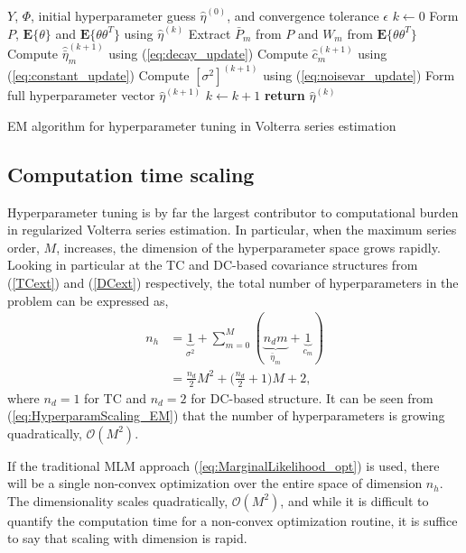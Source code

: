 \begin{algorithm}[h]
\begin{algorithmic}[1]
\Require $Y$, $\Phi$, initial hyperparameter guess $\hat{\eta}^{(0)}$, and convergence tolerance $\epsilon$
\State $k \gets 0$
\State Form $P$, $\textbf{E} \{ \theta \}$ and $\textbf{E} \{ \theta \theta^T \}$ using $\hat{\eta}^{(k)}$
\State Extract $\bar{P}_m$ from $P$ and $W_m$ from $\textbf{E} \{ \theta \theta^T \}$
	\State Compute $\hat{\bar{\eta}}_m^{(k+1)}$ using (\ref{eq:decay_update})
\EndIf
\State Compute $\hat{c}_m^{(k+1)}$ using (\ref{eq:constant_update})
\EndFor
\State Compute $[\sigma^2]^{(k+1)}$ using (\ref{eq:noisevar_update})
\State Form full hyperparameter vector $\hat{\eta}^{(k+1)}$
\State $k \gets k+1$
\EndWhile
\State \textbf{return} $\hat{\eta}^{(k)}$
\end{algorithmic}
\caption{EM algorithm for hyperparameter tuning in Volterra series estimation}
\label{alg:EMtuning}
\end{algorithm}

\subsection{Computation time scaling}

Hyperparameter tuning is by far the largest contributor to computational burden in regularized Volterra series estimation. In particular, when the maximum series order, $M$, increases, the dimension of the hyperparameter space grows rapidly. Looking in particular at the TC and DC-based covariance structures from (\ref{TCext}) and (\ref{DCext}) respectively, the total number of hyperparameters in the problem can be expressed as,
\begin{align}
n_h &= \underbrace{1}_{\sigma^2} + \sum_{m=0}^M (\underbrace{n_d m}_{\bar{\eta}_m} + \underbrace{1}_{c_m}) \\
&= \frac{n_d}{2} M^2 + \bigg( \frac{n_d}{2} + 1 \bigg) M + 2,
\label{eq:HyperparamScaling_EM}
\end{align}
where $n_d = 1$ for TC and $n_d = 2$ for DC-based structure. It can be seen from (\ref{eq:HyperparamScaling_EM}) that the number of hyperparameters is growing quadratically, $\mathcal{O}(M^2)$.

If the traditional MLM approach (\ref{eq:MarginalLikelihood_opt}) is used, there will be a single non-convex optimization over the entire space of dimension $n_h$. The dimensionality scales quadratically, $\mathcal{O}(M^2)$, and while it is difficult to quantify the computation time for a non-convex optimization routine, it is suffice to say that scaling with dimension is rapid. 

